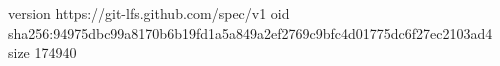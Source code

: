 version https://git-lfs.github.com/spec/v1
oid sha256:94975dbc99a8170b6b19fd1a5a849a2ef2769c9bfc4d01775dc6f27ec2103ad4
size 174940
